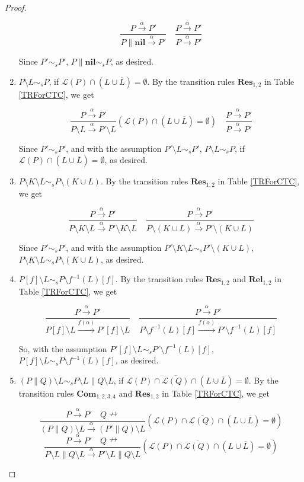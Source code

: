 \begin{proof}
\begin{enumerate}
      $$\frac{P\xrightarrow{\alpha}P'}{P\parallel \textbf{nil}\xrightarrow{\alpha}P'} \quad \frac{P\xrightarrow{\alpha}P'}{P\xrightarrow{\alpha}P'}$$

      Since $P'\sim_s P'$, $P\parallel \textbf{nil}\sim_s P$, as desired.
  \item $P\setminus L\sim_s P$, if $\mathcal{L}(P)\cap(L\cup\overline{L})=\emptyset$. By the transition rules $\textbf{Res}_{1,2}$ in Table \ref{TRForCTC}, we get

      $$\frac{P\xrightarrow{\alpha}P'}{P\setminus L\xrightarrow{\alpha}P'\setminus L} (\mathcal{L}(P)\cap(L\cup\overline{L})=\emptyset)\quad \frac{P\xrightarrow{\alpha}P'}{P\xrightarrow{\alpha}P'}$$

      Since $P'\sim_s P'$, and with the assumption $P'\setminus L\sim_s P'$, $P\setminus L\sim_s P$, if $\mathcal{L}(P)\cap(L\cup\overline{L})=\emptyset$, as desired.
  \item $P\setminus K\setminus L\sim_s P\setminus(K\cup L)$. By the transition rules $\textbf{Res}_{1,2}$ in Table \ref{TRForCTC}, we get

      $$\frac{P\xrightarrow{\alpha}P'}{P\setminus K\setminus L\xrightarrow{\alpha}P'\setminus K\setminus L} \quad \frac{P\xrightarrow{\alpha}P'}{P\setminus (K\cup L)\xrightarrow{\alpha}P'\setminus (K\cup L)}$$

      Since $P'\sim_s P'$, and with the assumption $P'\setminus K\setminus L\sim_s P'\setminus(K\cup L)$, $P\setminus K\setminus L\sim_s P\setminus(K\cup L)$, as desired.
  \item $P[f]\setminus L\sim_s P\setminus f^{-1}(L)[f]$. By the transition rules $\textbf{Res}_{1,2}$ and $\textbf{Rel}_{1,2}$ in Table \ref{TRForCTC}, we get

      $$\frac{P\xrightarrow{\alpha}P'}{P[f]\setminus L\xrightarrow{f(\alpha)}P'[f]\setminus L}\quad \frac{P\xrightarrow{\alpha}P'}{P\setminus f^{-1}(L)[f]\xrightarrow{f(\alpha)}P'\setminus f^{-1}(L)[f]}$$

      So, with the assumption $P'[f]\setminus L\sim_s P'\setminus f^{-1}(L)[f]$, $P[f]\setminus L\sim_s P\setminus f^{-1}(L)[f]$, as desired.
  \item $(P\parallel Q)\setminus L\sim_s P\setminus L\parallel Q\setminus L$, if $\mathcal{L}(P)\cap\overline{\mathcal{L}(Q)}\cap(L\cup\overline{L})=\emptyset$. By the transition rules $\textbf{Com}_{1,2,3,4}$ and $\textbf{Res}_{1,2}$ in Table \ref{TRForCTC}, we get

      $$\frac{P\xrightarrow{\alpha}P'\quad Q\nrightarrow}{(P\parallel Q)\setminus L\xrightarrow{\alpha}(P'\parallel Q)\setminus L}(\mathcal{L}(P)\cap\overline{\mathcal{L}(Q)}\cap(L\cup\overline{L})=\emptyset)$$
      $$\frac{P\xrightarrow{\alpha}P'\quad Q\nrightarrow}{P\setminus L\parallel Q\setminus L\xrightarrow{\alpha}P'\setminus L\parallel Q\setminus L}(\mathcal{L}(P)\cap\overline{\mathcal{L}(Q)}\cap(L\cup\overline{L})=\emptyset)$$


\end{enumerate}
\end{proof}
